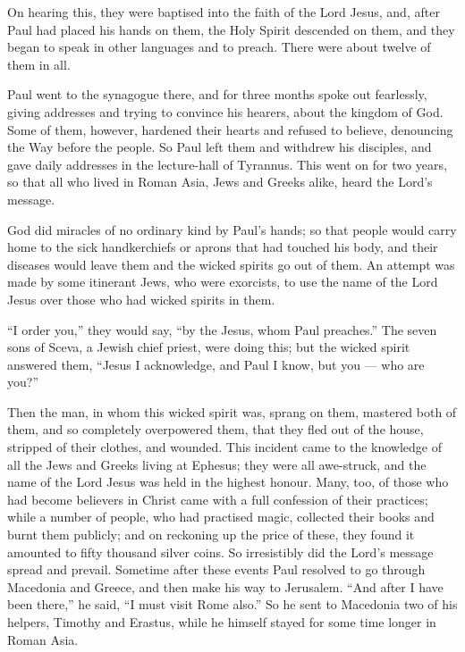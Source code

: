  On hearing this, they were baptised into the faith of the
Lord Jesus,  and, after Paul had placed his hands on them,
the Holy Spirit descended on them, and they began to speak in other
languages and to preach.  There were about twelve of them in
all.

 Paul went to the synagogue there, and for three months
spoke out fearlessly, giving addresses and trying to convince his
hearers, about the kingdom of God.  Some of them, however,
hardened their hearts and refused to believe, denouncing the Way before
the people. So Paul left them and withdrew his disciples, and gave daily
addresses in the lecture-hall of Tyrannus.  This went on
for two years, so that all who lived in Roman Asia, Jews and Greeks
alike, heard the Lord's message.

 God did miracles of no ordinary kind by Paul's hands;
 so that people would carry home to the sick handkerchiefs
or aprons that had touched his body, and their diseases would leave them
and the wicked spirits go out of them.  An attempt was made
by some itinerant Jews, who were exorcists, to use the name of the Lord
Jesus over those who had wicked spirits in them.

``I order you,'' they would say, ``by the Jesus, whom Paul preaches.''
 The seven sons of Sceva, a Jewish chief priest, were doing
this;  but the wicked spirit answered them, ``Jesus I
acknowledge, and Paul I know, but you --- who are you?''

 Then the man, in whom this wicked spirit was, sprang on
them, mastered both of them, and so completely overpowered them, that
they fled out of the house, stripped of their clothes, and wounded.
 This incident came to the knowledge of all the Jews and
Greeks living at Ephesus; they were all awe-struck, and the name of the
Lord Jesus was held in the highest honour.  Many, too, of
those who had become believers in Christ came with a full confession of
their practices;  while a number of people, who had
practised magic, collected their books and burnt them publicly; and on
reckoning up the price of these, they found it amounted to fifty
thousand silver coins.  So irresistibly did the Lord's
message spread and prevail.  Sometime after these events
Paul resolved to go through Macedonia and Greece, and then make his way
to Jerusalem. ``And after I have been there,'' he said, ``I must visit
Rome also.''  So he sent to Macedonia two of his helpers,
Timothy and Erastus, while he himself stayed for some time longer in
Roman Asia.

